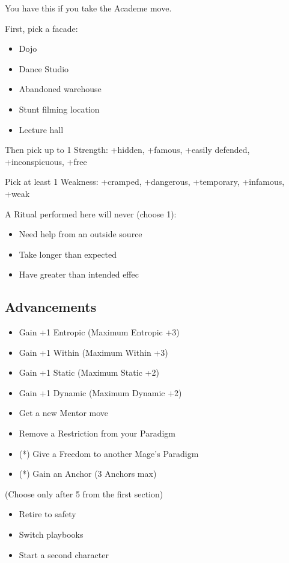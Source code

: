 \documentclass[
  oneside,
  statementpaper,
  9pt]{memoir}
\begin{document}
You have this if you take the Academe move.

First, pick a facade:

\begin{itemize}
\tightlist
\item
  Dojo
\item
  Dance Studio
\item
  Abandoned warehouse
\item
  Stunt filming location
\item
  Lecture hall
\end{itemize}

Then pick up to 1 Strength: +hidden, +famous, +easily defended,
+inconspicuous, +free

Pick at least 1 Weakness: +cramped, +dangerous, +temporary, +infamous,
+weak

A Ritual performed here will never (choose 1):

\begin{itemize}
\tightlist
\item
  Need help from an outside source
\item
  Take longer than expected
\item
  Have greater than intended effec
\end{itemize}

\hypertarget{advancements-3}{%
\subsection{Advancements}\label{advancements-3}}

\begin{itemize}
\tightlist
\item
  Gain +1 Entropic (Maximum Entropic +3)
\item
  Gain +1 Within (Maximum Within +3)
\item
  Gain +1 Static (Maximum Static +2)
\item
  Gain +1 Dynamic (Maximum Dynamic +2)
\item
  Get a new Mentor move
\item
  Remove a Restriction from your Paradigm
\item
  (*) Give a Freedom to another Mage's Paradigm
\item
  (*) Gain an Anchor (3 Anchors max)
\end{itemize}

(Choose only after 5 from the first section)

\begin{itemize}
\tightlist
\item
  Retire to safety
\item
  Switch playbooks
\item
  Start a second character
\end{itemize}
\end{document}
